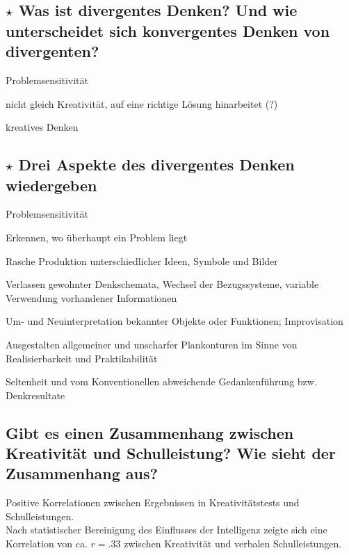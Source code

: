 \documentclass[a4paper,9pt,DIV=14]{scrartcl}
\begin{document}
\subsection{$\star$ Was ist divergentes Denken? Und wie unterscheidet sich konvergentes Denken von divergenten? } %
    \begin{labeling}{Problemsensitivität}
        \item [konvergentes Denken] nicht gleich Kreativität, auf eine richtige Lösung hinarbeitet (?)
        \item [divergentes Denken] kreatives Denken
    \end{labeling}

\subsection{$\star$ Drei Aspekte des divergentes Denken wiedergeben} %
    \begin{labeling}{Problemsensitivität}
        \item [Problemsensitivität] Erkennen, wo überhaupt ein Problem liegt
        \item [Flüssigkeit] Rasche Produktion unterschiedlicher Ideen, Symbole und Bilder
        \item [Flexibilität] Verlassen gewohnter Denkschemata, Wechsel der Bezugssysteme, variable Verwendung vorhandener Informationen
        \item [Redefinition] Um- und Neuinterpretation bekannter Objekte oder Funktionen; Improvisation
        \item [Elaboration] Ausgestalten allgemeiner und unscharfer Plankonturen im Sinne von Realisierbarkeit und Praktikabilität
        \item [Originalität] Seltenheit und vom Konventionellen abweichende Gedankenführung bzw. Denkresultate
    \end{labeling}

\subsection{Gibt es einen Zusammenhang zwischen Kreativität und Schulleistung? Wie sieht der Zusammenhang aus?}
    Positive Korrelationen zwischen Ergebnissen in Kreativitätstests und Schulleistungen.\\
    Nach statistischer Bereinigung des Einflusses der Intelligenz zeigte sich eine Korrelation von ca. $r = .33$ zwischen Kreativität und verbalen Schulleistungen.
\end{document}
